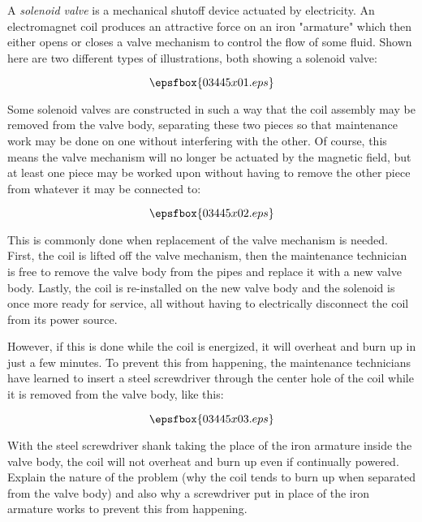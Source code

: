 

A {\it solenoid valve} is a mechanical shutoff device actuated by electricity.  An electromagnet coil produces an attractive force on an iron "armature" which then either opens or closes a valve mechanism to control the flow of some fluid.  Shown here are two different types of illustrations, both showing a solenoid valve:

$$\epsfbox{03445x01.eps}$$

Some solenoid valves are constructed in such a way that the coil assembly may be removed from the valve body, separating these two pieces so that maintenance work may be done on one without interfering with the other.  Of course, this means the valve mechanism will no longer be actuated by the magnetic field, but at least one piece may be worked upon without having to remove the other piece from whatever it may be connected to:

$$\epsfbox{03445x02.eps}$$

This is commonly done when replacement of the valve mechanism is needed.  First, the coil is lifted off the valve mechanism, then the maintenance technician is free to remove the valve body from the pipes and replace it with a new valve body.  Lastly, the coil is re-installed on the new valve body and the solenoid is once more ready for service, all without having to electrically disconnect the coil from its power source.

\goodbreak
However, if this is done while the coil is energized, it will overheat and burn up in just a few minutes.  To prevent this from happening, the maintenance technicians have learned to insert a steel screwdriver through the center hole of the coil while it is removed from the valve body, like this:

$$\epsfbox{03445x03.eps}$$

With the steel screwdriver shank taking the place of the iron armature inside the valve body, the coil will not overheat and burn up even if continually powered.  Explain the nature of the problem (why the coil tends to burn up when separated from the valve body) and also why a screwdriver put in place of the iron armature works to prevent this from happening.







